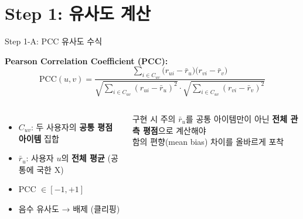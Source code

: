 \documentclass[aspectratio=169, 10pt]{beamer}
\begin{document}
\section{Step 1: 유사도 계산}

\begin{frame}{Step 1-A: PCC 유사도 수식}

  \textbf{Pearson Correlation Coefficient (PCC):}
  \begin{equation*}
    \text{PCC}(u,v) =
    \frac{\displaystyle\sum_{i \in C_{uv}}
          \bigl(r_{ui} - \bar{r}_u\bigr)\bigl(r_{vi} - \bar{r}_v\bigr)}
         {\sqrt{\displaystyle\sum_{i \in C_{uv}}(r_{ui}-\bar{r}_u)^2}
          \cdot
          \sqrt{\displaystyle\sum_{i \in C_{uv}}(r_{vi}-\bar{r}_v)^2}}
  \end{equation*}

  \vspace{0.4em}
  \begin{columns}[T]
      \begin{itemize}
        \item $C_{uv}$: 두 사용자의 \textbf{공통 평점 아이템} 집합
        \item $\bar{r}_u$: 사용자 $u$의 \textbf{전체 평균} (공통에 국한 X)
        \item PCC $\in [-1, +1]$
        \item 음수 유사도 → 배제 (클리핑)
      \end{itemize}

      \begin{alertblock}{구현 시 주의}
        $\bar{r}_u$를 공통 아이템만이 아닌
        \textbf{전체 관측 평점}으로 계산해야\\
        함의 편향(mean bias) 차이를 올바르게 포착
      \end{alertblock}
  \end{columns}
\end{frame}
\end{document}
